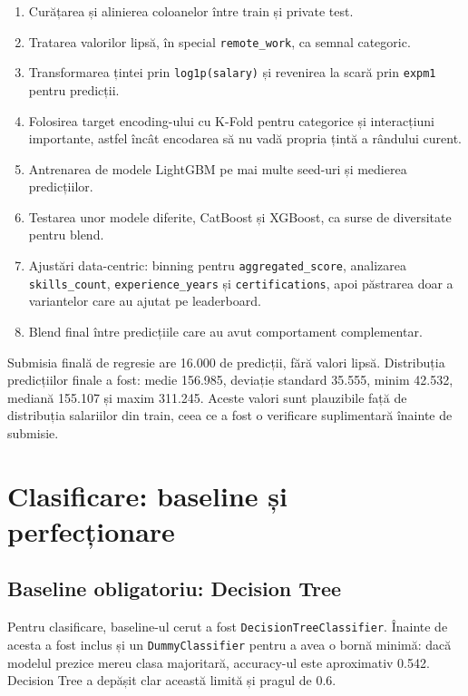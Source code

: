 \documentclass[12pt,a4paper]{article}
\begin{document}
\begin{enumerate}
\item Curățarea și alinierea coloanelor între train și private test.
\item Tratarea valorilor lipsă, în special \texttt{remote\_work}, ca semnal categoric.
\item Transformarea țintei prin \texttt{log1p(salary)} și revenirea la scară prin \texttt{expm1} pentru predicții.
\item Folosirea target encoding-ului cu K-Fold pentru categorice și interacțiuni importante, astfel încât encodarea să nu vadă propria țintă a rândului curent.
\item Antrenarea de modele LightGBM pe mai multe seed-uri și medierea predicțiilor.
\item Testarea unor modele diferite, CatBoost și XGBoost, ca surse de diversitate pentru blend.
\item Ajustări data-centric: binning pentru \texttt{aggregated\_score}, analizarea \texttt{skills\_count}, \texttt{experience\_years} și \texttt{certifications}, apoi păstrarea doar a variantelor care au ajutat pe leaderboard.
\item Blend final între predicțiile care au avut comportament complementar.
\end{enumerate}

Submisia finală de regresie are 16.000 de predicții, fără valori lipsă. Distribuția predicțiilor finale a fost: medie 156.985, deviație standard 35.555, minim 42.532, mediană 155.107 și maxim 311.245. Aceste valori sunt plauzibile față de distribuția salariilor din train, ceea ce a fost o verificare suplimentară înainte de submisie.

\section{Clasificare: baseline și perfecționare}
\subsection{Baseline obligatoriu: Decision Tree}
Pentru clasificare, baseline-ul cerut a fost \texttt{DecisionTreeClassifier}. Înainte de acesta a fost inclus și un \texttt{DummyClassifier} pentru a avea o bornă minimă: dacă modelul prezice mereu clasa majoritară, accuracy-ul este aproximativ 0.542. Decision Tree a depășit clar această limită și pragul de 0.6.
\end{document}
